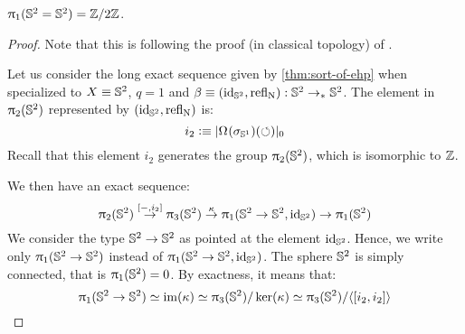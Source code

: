 \documentclass[english,a4paper]{lmcs}
\begin{document}
\begin{thm} \label{thm:Sp-sym=Z/2}
  $\uppi_{1} ({{\mathbb S^{2}}} = {{\mathbb S^{2}}}) = \mathbb{Z}/2 \mathbb{Z}$.
  \label{thm:S2-eq-S2-not-simply-connected}
\end{thm}
\begin{proof}
  Note that this is following the proof (in classical topology) of \cite{gwwhitehead}.

  Let us consider the long exact sequence given by \cref{thm:sort-of-ehp} when
  specialized to $X \equiv {{\mathbb S^{2}}}$, $q=1$ and $\beta\equiv (\mathord{\mathrm{id}}_{{\mathbb S^{2}}}, \mathop{{\mathrm{refl}}_{\mathrm{N}}}): {{\mathbb S^{2}}}
  \to_\ast {{\mathbb S^{2}}}$. The element in $\uppi_{2}({{\mathbb S^{2}}})$ represented by $(\mathord{\mathrm{id}}_{{\mathbb S^{2}}}, \mathop{{\mathrm{refl}}_{\mathrm{N}}})$
  is:
  \begin{equation}
    i_2 \vcentcolon\equiv \lvert\mathop{\Omega^{}}(\sigma_{{\mathbb S^{1}}})(\mathord{\circlearrowleft})\rvert_0
    \label{eq:def-i2-gen-pi2S2}
  \end{equation}
  Recall that this element $i_2$ generates the group $\uppi_{2}({{\mathbb S^{2}}})$, which is
  isomorphic to $\mathbb{Z}$.

  We then have an exact sequence:
  \begin{equation}
    \uppi_{2}({{\mathbb S^{2}}}) \overset{[\mathord{{-}}, i_2]} \to \uppi_{3}({{\mathbb S^{2}}})
    \overset\kappa \to \uppi_{1} ({{\mathbb S^{2}}} \to {{\mathbb S^{2}}}, \mathord{\mathrm{id}}_{{\mathbb S^{2}}}) \to \uppi_{1} ({{\mathbb S^{2}}})
    \label{eq:exact-seq-compute-pi1-S2eqS2}
  \end{equation}
  We consider the type ${{\mathbb S^{2}}} \to {{\mathbb S^{2}}}$ as pointed at the element $\mathord{\mathrm{id}}_{{\mathbb S^{2}}}$. Hence,
  we write only $\uppi_{1}({{\mathbb S^{2}}} \to {{\mathbb S^{2}}})$ instead of $\uppi_{1}({{\mathbb S^{2}}}\to{{\mathbb S^{2}}},\mathord{\mathrm{id}}_{{\mathbb S^{2}}})$.
  The sphere ${{\mathbb S^{2}}}$ is simply connected, that is $\uppi_{1}({{\mathbb S^{2}}}) = 0$. By exactness,
  it means that:
  \begin{equation}
    \uppi_{1}({{\mathbb S^{2}}} \to {{\mathbb S^{2}}}) \simeq \operatorname{im}(\kappa) \simeq \uppi_{3}({{\mathbb S^{2}}}) / \ker(\kappa)
    \simeq \uppi_{3} ({{\mathbb S^{2}}}) / \langle [i_2,i_2] \rangle
    \label{eq:fgr-SpeqSp-as-quotient}
  \end{equation}


\end{proof}
\end{document}
